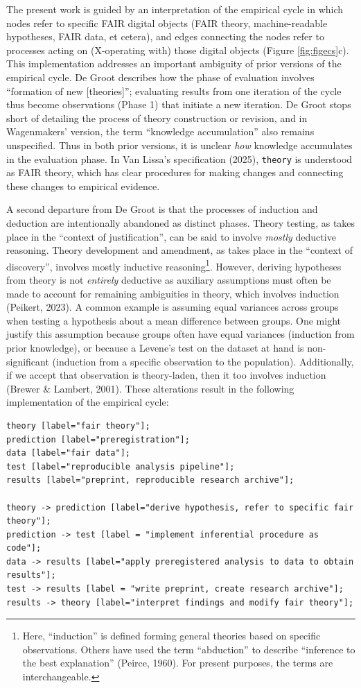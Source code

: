 \documentclass[
  man, noextraspace,floatsintext]{apa7}
\begin{document}
The present work is guided by an interpretation of the empirical cycle in which nodes refer to specific FAIR digital objects (FAIR theory, machine-readable hypotheses, FAIR data, et cetera),
and edges connecting the nodes refer to processes acting on (X-operating with) those digital objects (Figure \ref{fig:figecs}c).
This implementation addresses an important ambiguity of prior versions of the empirical cycle.
De Groot describes how the phase of evaluation involves ``formation of new {[}theories{]}'';
evaluating results from one iteration of the cycle thus become observations (Phase 1) that initiate a new iteration.
De Groot stops short of detailing the process of theory construction or revision,
and in Wagenmakers' version, the term ``knowledge accumulation'' also remains unspecified.
Thus in both prior versions, it is unclear \emph{how} knowledge accumulates in the evaluation phase.
In Van Lissa's specification (2025), \texttt{theory} is understood as FAIR theory,
which has clear procedures for making changes and connecting these changes to empirical evidence.

A second departure from De Groot is that the processes of induction and deduction are intentionally abandoned as distinct phases.
Theory testing, as takes place in the ``context of justification'', can be said to involve \emph{mostly} deductive reasoning.
Theory development and amendment, as takes place in the ``context of discovery'', involves mostly inductive reasoning\footnote{Here, ``induction'' is defined forming general theories based on specific observations. Others have used the term ``abduction'' to describe ``inference to the best explanation'' (Peirce, 1960). For present purposes, the terms are interchangeable.}.
However, deriving hypotheses from theory is not \emph{entirely} deductive
as auxiliary assumptions must often be made to account for remaining ambiguities in theory, which involves induction (Peikert, 2023).
A common example is assuming equal variances across groups when testing a hypothesis about a mean difference between groups.
One might justify this assumption because groups often have equal variances (induction from prior knowledge), or because a Levene's test on the dataset at hand is non-significant (induction from a specific observation to the population).
Additionally, if we accept that observation is theory-laden, then it too involves induction (Brewer \& Lambert, 2001).
These alterations result in the following implementation of the empirical cycle:

\begin{verbatim}
theory [label="fair theory"];
prediction [label="preregistration"];
data [label="fair data"];
test [label="reproducible analysis pipeline"];
results [label="preprint, reproducible research archive"];

theory -> prediction [label="derive hypothesis, refer to specific fair theory"];
prediction -> test [label = "implement inferential procedure as code"];
data -> results [label="apply preregistered analysis to data to obtain results"];
test -> results [label = "write preprint, create research archive"];
results -> theory [label="interpret findings and modify fair theory"];
\end{verbatim}
\end{document}
